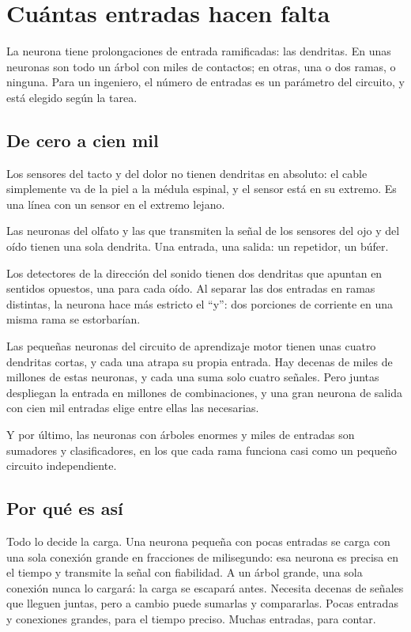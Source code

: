 \chapter{Cuántas entradas hacen falta}

La neurona tiene prolongaciones de entrada ramificadas: las dendritas. En unas neuronas son todo un árbol con miles de contactos; en otras, una o dos ramas, o ninguna. Para un ingeniero, el número de entradas es un parámetro del circuito, y está elegido según la tarea.

\section*{De cero a cien mil}

Los sensores del tacto y del dolor no tienen dendritas en absoluto: el cable simplemente va de la piel a la médula espinal, y el sensor está en su extremo. Es una línea con un sensor en el extremo lejano.


Las neuronas del olfato y las que transmiten la señal de los sensores del ojo y del oído tienen una sola dendrita. Una entrada, una salida: un repetidor, un búfer.

Los detectores de la dirección del sonido tienen dos dendritas que apuntan en sentidos opuestos, una para cada oído. Al separar las dos entradas en ramas distintas, la neurona hace más estricto el “y”: dos porciones de corriente en una misma rama se estorbarían.

Las pequeñas neuronas del circuito de aprendizaje motor tienen unas cuatro dendritas cortas, y cada una atrapa su propia entrada. Hay decenas de miles de millones de estas neuronas, y cada una suma solo cuatro señales. Pero juntas despliegan la entrada en millones de combinaciones, y una gran neurona de salida con cien mil entradas elige entre ellas las necesarias.

Y por último, las neuronas con árboles enormes y miles de entradas son sumadores y clasificadores, en los que cada rama funciona casi como un pequeño circuito independiente.

\section*{Por qué es así}

Todo lo decide la carga. Una neurona pequeña con pocas entradas se carga con una sola conexión grande en fracciones de milisegundo: esa neurona es precisa en el tiempo y transmite la señal con fiabilidad. A un árbol grande, una sola conexión nunca lo cargará: la carga se escapará antes. Necesita decenas de señales que lleguen juntas, pero a cambio puede sumarlas y compararlas. Pocas entradas y conexiones grandes, para el tiempo preciso. Muchas entradas, para contar.

